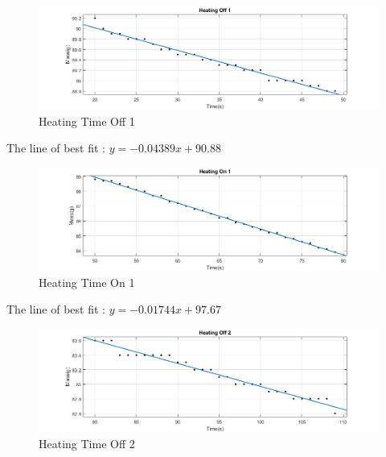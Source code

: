 
\newpage
\begin{figure}[h!]
    \centering
    \includegraphics[width=\textwidth]{figures/TimeOff1_c.png}
    \caption{Heating Time Off 1}
    \label{fig:yx}
\end{figure}
The line of best fit : $ y = -0.04389x + 90.88$ \\
\newpage
\begin{figure}[h!]
    \centering
    \includegraphics[width=\textwidth]{figures/TimeOn1_c.png}
    \caption{Heating Time On 1}
    \label{fig:yx}
\end{figure}
The line of best fit : $ y = -0.01744x + 97.67$ \\
\newpage
\begin{figure}[h!]
    \centering
    \includegraphics[width=\textwidth]{figures/TimeOff2_c.png}
    \caption{Heating Time Off 2}
    \label{fig:yx}
\end{figure}
